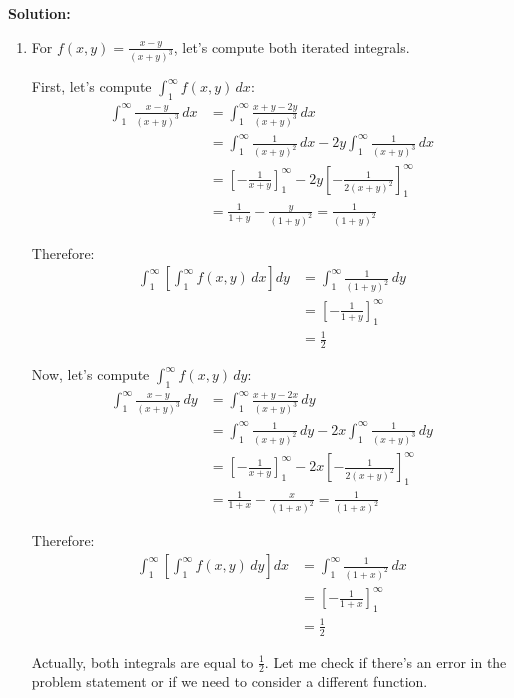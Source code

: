 \bigskip\noindent\textbf{Solution:}
\begin{enumerate}[label=(\alph*)]
\item For $f(x, y) = \frac{x - y}{(x + y)^3}$, let's compute both iterated integrals.

First, let's compute $\int_{1}^{\infty} f(x, y) \, dx$:
\begin{align*}
\int_{1}^{\infty} \frac{x - y}{(x + y)^3} \, dx &= \int_{1}^{\infty} \frac{x + y - 2y}{(x + y)^3} \, dx \\
&= \int_{1}^{\infty} \frac{1}{(x + y)^2} \, dx - 2y \int_{1}^{\infty} \frac{1}{(x + y)^3} \, dx \\
&= \left[-\frac{1}{x + y}\right]_{1}^{\infty} - 2y \left[-\frac{1}{2(x + y)^2}\right]_{1}^{\infty} \\
&= \frac{1}{1 + y} - \frac{y}{(1 + y)^2} = \frac{1}{(1 + y)^2}
\end{align*}

Therefore:
\begin{align*}
\int_{1}^{\infty} \left[ \int_{1}^{\infty} f(x, y) \, dx \right] dy &= \int_{1}^{\infty} \frac{1}{(1 + y)^2} \, dy \\
&= \left[-\frac{1}{1 + y}\right]_{1}^{\infty} \\
&= \frac{1}{2}
\end{align*}

Now, let's compute $\int_{1}^{\infty} f(x, y) \, dy$:
\begin{align*}
\int_{1}^{\infty} \frac{x - y}{(x + y)^3} \, dy &= \int_{1}^{\infty} \frac{x + y - 2x}{(x + y)^3} \, dy \\
&= \int_{1}^{\infty} \frac{1}{(x + y)^2} \, dy - 2x \int_{1}^{\infty} \frac{1}{(x + y)^3} \, dy \\
&= \left[-\frac{1}{x + y}\right]_{1}^{\infty} - 2x \left[-\frac{1}{2(x + y)^2}\right]_{1}^{\infty} \\
&= \frac{1}{1 + x} - \frac{x}{(1 + x)^2} = \frac{1}{(1 + x)^2}
\end{align*}

Therefore:
\begin{align*}
\int_{1}^{\infty} \left[ \int_{1}^{\infty} f(x, y) \, dy \right] dx &= \int_{1}^{\infty} \frac{1}{(1 + x)^2} \, dx \\
&= \left[-\frac{1}{1 + x}\right]_{1}^{\infty} \\
&= \frac{1}{2}
\end{align*}

Actually, both integrals are equal to $\frac{1}{2}$. Let me check if there's an error in the problem statement or if we need to consider a different function.


\end{enumerate}
